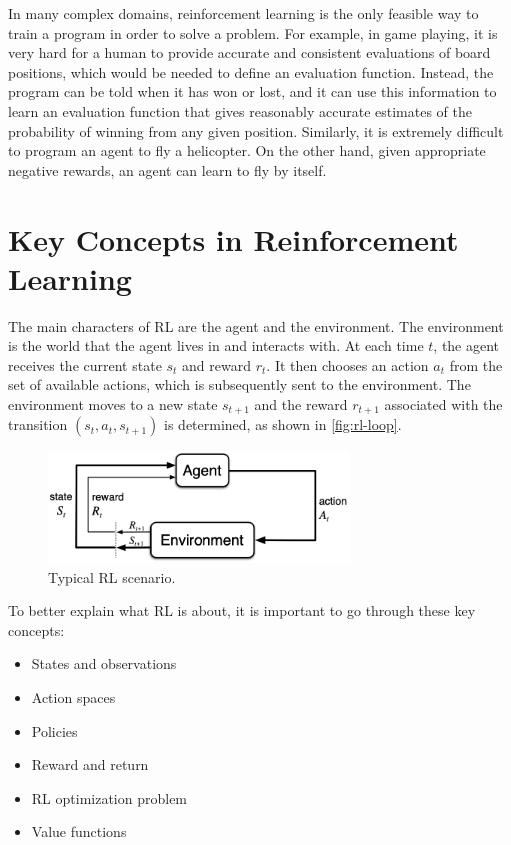 \documentclass{article}
\begin{document}
In many complex domains, reinforcement learning is the only feasible way to train a program in order to solve a problem. For example, in game playing, it is very hard for a human to provide accurate and consistent evaluations of board positions, which would be needed to define an evaluation function. Instead, the program can be told when it has won or lost, and it can use this information to learn an evaluation function that gives reasonably accurate estimates of the probability of winning from any given position. Similarly, it is extremely difficult to program an agent to fly a helicopter. On the other hand, given appropriate negative rewards, an agent can learn to fly by itself.\cite{russell2016artificial}


\section{Key Concepts in Reinforcement Learning}

The main characters of RL are the agent and the environment. The environment is the world that the agent lives in and interacts with. At each time $t$, the agent receives the current state $s_t$ and reward $r_t$. It then chooses an action $a_t$ from the set of available actions, which is subsequently sent to the environment. The environment moves to a new state $s_{t+1}$ and the reward $r_{t+1}$ associated with the transition $(s_{t},a_{t},s_{t+1})$ is determined, as shown in \autoref{fig:rl-loop}.

\begin{figure}
	\centering
	\includegraphics[width=8cm]{rl-loop.png}
	\caption{Typical RL scenario. \cite{10.5555/3312046}}
	\label{fig:rl-loop}
\end{figure}

To better explain what RL is about, it is important to go through these key concepts: \cite{SpinningUp2018}

\begin{itemize}
	\item States and observations
	\item Action spaces
	\item Policies
	\item Reward and return
	\item RL optimization problem
	\item Value functions
\end{itemize}
\end{document}
